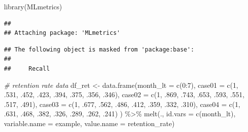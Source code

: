 \documentclass[
]{book}
\newenvironment{Shaded}{\begin{snugshade}}{\end{snugshade}}
\newcommand{\AttributeTok}[1]{\textcolor[rgb]{0.77,0.63,0.00}{#1}}
\newcommand{\CommentTok}[1]{\textcolor[rgb]{0.56,0.35,0.01}{\textit{#1}}}
\newcommand{\DecValTok}[1]{\textcolor[rgb]{0.00,0.00,0.81}{#1}}
\newcommand{\FunctionTok}[1]{\textcolor[rgb]{0.00,0.00,0.00}{#1}}
\newcommand{\NormalTok}[1]{#1}
\newcommand{\OtherTok}[1]{\textcolor[rgb]{0.56,0.35,0.01}{#1}}
\newcommand{\SpecialCharTok}[1]{\textcolor[rgb]{0.00,0.00,0.00}{#1}}
\newcommand{\StringTok}[1]{\textcolor[rgb]{0.31,0.60,0.02}{#1}}
\begin{document}
\begin{Shaded}
\begin{Highlighting}[]
\FunctionTok{library}\NormalTok{(MLmetrics)}
\end{Highlighting}
\end{Shaded}

\begin{verbatim}
## 
## Attaching package: 'MLmetrics'
\end{verbatim}

\begin{verbatim}
## The following object is masked from 'package:base':
## 
##     Recall
\end{verbatim}

\begin{Shaded}
\begin{Highlighting}[]
\CommentTok{\# retention rate data}
\NormalTok{df\_ret }\OtherTok{\textless{}{-}} \FunctionTok{data.frame}\NormalTok{(}\AttributeTok{month\_lt =} \FunctionTok{c}\NormalTok{(}\DecValTok{0}\SpecialCharTok{:}\DecValTok{7}\NormalTok{),}
                     \AttributeTok{case01 =} \FunctionTok{c}\NormalTok{(}\DecValTok{1}\NormalTok{, .}\DecValTok{531}\NormalTok{, .}\DecValTok{452}\NormalTok{, .}\DecValTok{423}\NormalTok{, .}\DecValTok{394}\NormalTok{, .}\DecValTok{375}\NormalTok{, .}\DecValTok{356}\NormalTok{, .}\DecValTok{346}\NormalTok{),}
                     \AttributeTok{case02 =} \FunctionTok{c}\NormalTok{(}\DecValTok{1}\NormalTok{, .}\DecValTok{869}\NormalTok{, .}\DecValTok{743}\NormalTok{, .}\DecValTok{653}\NormalTok{, .}\DecValTok{593}\NormalTok{, .}\DecValTok{551}\NormalTok{, .}\DecValTok{517}\NormalTok{, .}\DecValTok{491}\NormalTok{),}
                     \AttributeTok{case03 =} \FunctionTok{c}\NormalTok{(}\DecValTok{1}\NormalTok{, .}\DecValTok{677}\NormalTok{, .}\DecValTok{562}\NormalTok{, .}\DecValTok{486}\NormalTok{, .}\DecValTok{412}\NormalTok{, .}\DecValTok{359}\NormalTok{, .}\DecValTok{332}\NormalTok{, .}\DecValTok{310}\NormalTok{),}
                     \AttributeTok{case04 =} \FunctionTok{c}\NormalTok{(}\DecValTok{1}\NormalTok{, .}\DecValTok{631}\NormalTok{, .}\DecValTok{468}\NormalTok{, .}\DecValTok{382}\NormalTok{, .}\DecValTok{326}\NormalTok{, .}\DecValTok{289}\NormalTok{, .}\DecValTok{262}\NormalTok{, .}\DecValTok{241}\NormalTok{)}
\NormalTok{                     ) }\SpecialCharTok{\%\textgreater{}\%}
        \FunctionTok{melt}\NormalTok{(., }\AttributeTok{id.vars =} \FunctionTok{c}\NormalTok{(}\StringTok{\textquotesingle{}month\_lt\textquotesingle{}}\NormalTok{), }\AttributeTok{variable.name =} \StringTok{\textquotesingle{}example\textquotesingle{}}\NormalTok{, }\AttributeTok{value.name =} \StringTok{\textquotesingle{}retention\_rate\textquotesingle{}}\NormalTok{)}
 

\end{Highlighting}
\end{Shaded}
\end{document}
